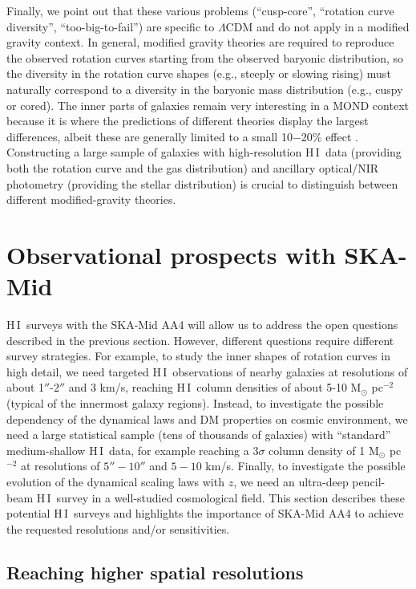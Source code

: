 \documentclass[a4paper,11pt]{article}
\newcommand{\hi } {{\rm H}\,{\small\rm I}}
\begin{document}
Finally, we point out that these various problems (``cusp-core'', ``rotation curve diversity'', ``too-big-to-fail'') are specific to $\Lambda$CDM and do not apply in a modified gravity context. In general, modified gravity theories are required to reproduce the observed rotation curves starting from the observed baryonic distribution, so the diversity in the rotation curve shapes (e.g., steeply or slowing rising) must naturally correspond to a diversity in the baryonic mass distribution (e.g., cuspy or cored). The inner parts of galaxies remain very interesting in a MOND context because it is where the predictions of different theories display the largest differences, albeit these are generally limited to a small 10$-$20\% effect \citep[e.g.,][]{Brada1995, Lelli2017b, Petersen2020, Chae2022b}. Constructing a large sample of galaxies with high-resolution \hi\ data (providing both the rotation curve and the gas distribution) and ancillary optical/NIR photometry (providing the stellar distribution) is crucial to distinguish between different modified-gravity theories.

\section{Observational prospects with SKA-Mid}\label{sec:prospects}

\hi\ surveys with the SKA-Mid AA4 will allow us to address the open questions described in the previous section. However, different questions require different survey strategies. For example, to study the inner shapes of rotation curves in high detail, we need targeted \hi\ observations of nearby galaxies at resolutions of about 1$''$-2$''$ and 3 km/s, reaching \hi\ column densities of about 5-10 M$_\odot$ pc$^{-2}$ (typical of the innermost galaxy regions). Instead, to investigate the possible dependency of the dynamical laws and DM properties on cosmic environment, we need a large statistical sample (tens of thousands of galaxies) with ``standard'' medium-shallow \hi\ data, for example reaching a 3$\sigma$ column density of 1 M$_\odot$ pc$^{-2}$ at resolutions of $5''-10''$ and $5-10$ km/s. Finally, to investigate the possible evolution of the dynamical scaling laws with $z$, we need an ultra-deep pencil-beam \hi\ survey in a well-studied cosmological field. This section describes these potential \hi\ surveys and highlights the importance of SKA-Mid AA4 to achieve the requested resolutions and/or sensitivities.

\subsection{Reaching higher spatial resolutions}\label{sec:highres}
\end{document}
